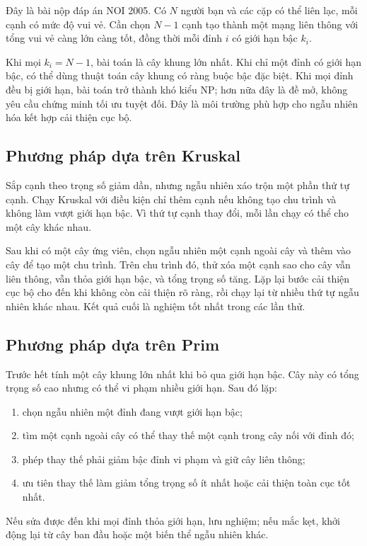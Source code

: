 \documentclass[11pt]{article}
\begin{document}
Đây là bài nộp đáp án NOI 2005. Có \(N\) người bạn và các cặp có thể liên lạc,
mỗi cạnh có mức độ vui vẻ. Cần chọn \(N-1\) cạnh tạo thành một mạng liên thông
với tổng vui vẻ càng lớn càng tốt, đồng thời mỗi đỉnh \(i\) có giới hạn bậc
\(k_i\).

Khi mọi \(k_i=N-1\), bài toán là cây khung lớn nhất. Khi chỉ một đỉnh có giới
hạn bậc, có thể dùng thuật toán cây khung có ràng buộc bậc đặc biệt. Khi mọi
đỉnh đều bị giới hạn, bài toán trở thành khó kiểu NP; hơn nữa đây là đề mở,
không yêu cầu chứng minh tối ưu tuyệt đối. Đây là môi trường phù hợp cho
ngẫu nhiên hóa kết hợp cải thiện cục bộ.

\subsection{Phương pháp dựa trên Kruskal}

Sắp cạnh theo trọng số giảm dần, nhưng ngẫu nhiên xáo trộn một phần thứ tự
cạnh. Chạy Kruskal với điều kiện chỉ thêm cạnh nếu không tạo chu trình và
không làm vượt giới hạn bậc. Vì thứ tự cạnh thay đổi, mỗi lần chạy có thể cho
một cây khác nhau.

Sau khi có một cây ứng viên, chọn ngẫu nhiên một cạnh ngoài cây và thêm vào
cây để tạo một chu trình. Trên chu trình đó, thử xóa một cạnh sao cho cây vẫn
liên thông, vẫn thỏa giới hạn bậc, và tổng trọng số tăng. Lặp lại bước cải
thiện cục bộ cho đến khi không còn cải thiện rõ ràng, rồi chạy lại từ nhiều
thứ tự ngẫu nhiên khác nhau. Kết quả cuối là nghiệm tốt nhất trong các lần
thử.

\subsection{Phương pháp dựa trên Prim}

Trước hết tính một cây khung lớn nhất khi bỏ qua giới hạn bậc. Cây này có
tổng trọng số cao nhưng có thể vi phạm nhiều giới hạn. Sau đó lặp:
\begin{enumerate}
  \item chọn ngẫu nhiên một đỉnh đang vượt giới hạn bậc;
  \item tìm một cạnh ngoài cây có thể thay thế một cạnh trong cây nối với
  đỉnh đó;
  \item phép thay thế phải giảm bậc đỉnh vi phạm và giữ cây liên thông;
  \item ưu tiên thay thế làm giảm tổng trọng số ít nhất hoặc cải thiện toàn
  cục tốt nhất.
\end{enumerate}
Nếu sửa được đến khi mọi đỉnh thỏa giới hạn, lưu nghiệm; nếu mắc kẹt, khởi
động lại từ cây ban đầu hoặc một biến thể ngẫu nhiên khác.
\end{document}
